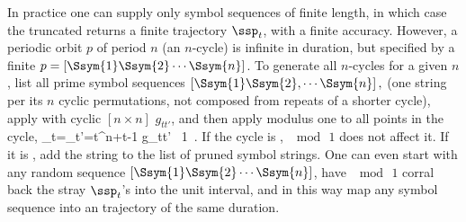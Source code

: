 In practice one can supply only symbol sequences of finite length, in which
case the truncated  returns a finite trajectory $\ssp_{t}$, with a
finite accuracy. However, a periodic orbit $p$ of period $n$ (an $n$-cycle)
is infinite in duration, but specified by a finite {\admissible} {\brick}
     \(p=[\Ssym{1}\Ssym{2}\cdots \Ssym{n}]\). %
To generate all {\admissible} $n$-cycles for a given $n$, list all prime
symbol sequences
      \([\Ssym{1}\Ssym{2},\cdots \Ssym{n}]\,,\) %
(one string per its $n$ cyclic permutations, not composed from
repeats of a shorter cycle),
apply  with cyclic $[n\!\times\!n]$ $g_{tt'}$, and then apply
modulus one to all points in the cycle,
\beq
  \ssp_{t}=\sum_{t'=t}^{n+t-1} g_{tt'} 
       \quad \mod \, 1
\,.
If the cycle is {\admissible}, $\mod \, 1$ does not affect it. If it is
{\inadmissible}, add the string to the list of pruned symbol strings.
One can even start with any random sequence
      \([\Ssym{1}\Ssym{2}\cdots \Ssym{n}]\),
have $\mod \, 1$ corral back the stray $\ssp_{t}$'s into the unit interval, and
in this way map any {\inadmissible} symbol sequence into an {\admissible}
trajectory of the same duration.
